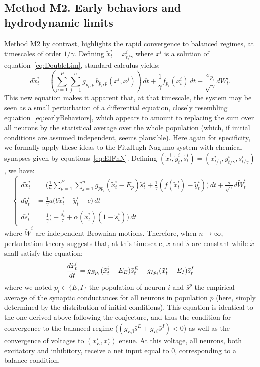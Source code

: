 \documentclass[onefignum,onetabnum]{siamart190516}
\newcommand{\1}{\mathbbm{1}}
\newcommand{\review}[1]{\textcolor{midblue}{ #1}}
\renewcommand{\review}[1]{{ #1}}
\begin{document}
\subsection{Method M2. Early behaviors and hydrodynamic limits}\label{sec:HeuristicTime}
\review{Method M2 by contrast, highlights the rapid convergence to balanced regimes, at timescales of order $1/\gamma$. Defining $\tilde{x}^i_t=x^i_{t/\gamma}$ where $x^i$ is a solution of equation~\eqref{eq:DoubleLim}, standard calculus yields: 
\begin{equation*}
d\tilde{x}^i_t =\left(\sum_{p=1}^P \sum_{j=1}^n g_{p_i,p} \,b_{p_i,p}(x^i,x^j) \right)\,dt + \frac{1}{\gamma} f_{p_i}(x^i_t)\,dt+ \frac{\sigma_{p_i}}{\sqrt{\gamma}} dW^i_t. 
\end{equation*}
This new equation makes it apparent that, at that timescale, the system may be seen as a small perturbation of a differential equation, closely resembling equation~\eqref{eq:earlyBehaviors}, which appears to amount to replacing the sum over all neurons by the statistical average over the whole population (which, if initial conditions are assumed independent, seems plausible). Here again for specificity, we formally apply these ideas to the FitzHugh-Nagumo system with chemical synapses given by equations~\eqref{eq:EIFhN}.} Defining $(\tilde{x}^i_t,\tilde{y}^i_t,\tilde{s}^i_t)=(x^i_{t/\gamma},y^i_{t/\gamma},s^i_{t/\gamma})$, we have:
\begin{equation}
		\begin{cases}
			d\tilde x^i_t&=\displaystyle{\Big(\frac{1}{n}\sum_{p=1}^P\sum_{j=1}^{n}g_{pp_i} (\tilde x^i_t-E_{p}) \tilde s^{j}_t+\frac 1 {\gamma} (f(\tilde x^i_t)-\tilde y^i_t)\Big)\,dt +\frac{\sigma}{\sqrt{\gamma}} d\tilde{W}^i_t}\\
			d\tilde y^i_t&=\frac 1 {\gamma} a\Big(b\tilde x^i_t-\tilde y^i_t+c\Big)\,dt\\
			d\tilde s^{i}_t&=\frac 1 {\gamma} \Big(-\frac{\tilde s^{i}_t}{\tau}+\alpha(\tilde x^i_t)(1-\tilde s^{i}_t)\Big)\,dt
		\end{cases}
	\end{equation}
	where $\tilde{W}^i$ are independent Brownian motions. Therefore, when $n\to\infty$, perturbation theory suggests that, at this timescale, $\tilde{x}$ and $\tilde{s}$ are constant while $\tilde x$ shall satisfy the equation:
 		\begin{equation}
		\nonumber \frac{d{\tilde{x}}^i_t}{dt}=g_{Ep_i} (\tilde x^i_t-E_{E}) \bar{s}^{E}_t +g_{Ip_i} (\tilde x^i_t-E_{I}) \bar{s}^{I}_t \\
		\end{equation}
	where we noted $p_i\in\{E,I\}$ the population of neuron $i$ and $\bar{s}^{p}$ the empirical average of the synaptic conductances for all neurons in population $p$ (here, simply determined by the distribution of initial conditions). This equation is identical to the one derived above following the conjecture, and thus the condition for convergence to the balanced regime ($(g_{E\beta} \bar{s}^E+g_{I\beta} \bar{s}^I)<0$) as well as the convergence of voltages to $(x^\star_E,x^\star_I)$ ensue. At this voltage, all neurons, both excitatory and inhibitory, receive a net input equal to $0$, corresponding to a balance condition. 
	
\end{document}
